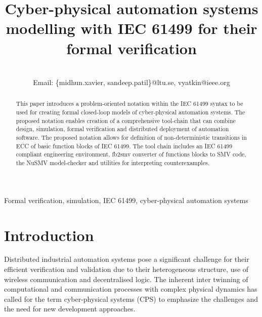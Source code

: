 \documentclass[conference]{IEEEtran}
\begin{document}
\title{Cyber-physical automation systems modelling with IEC 61499 for their formal verification}

\author{






\\ Email: \{midhun.xavier, sandeep.patil\}@ltu.se,  vyatkin@ieee.org
}


\maketitle

\begin{abstract}
This paper introduces a problem-oriented notation within the {IEC 61499} syntax to be used for creating formal closed-loop models of cyber-physical automation systems. The proposed notation enables creation of a comprehensive tool-chain that can combine design, simulation, formal verification and distributed deployment of automation software. 
The proposed notation allows for definition of non-deterministic transitions in ECC of basic function blocks of {IEC 61499}.
The tool chain includes an IEC 61499 compliant engineering environment, fb2smv converter of  functions blocks to {SMV} code, the  {NuSMV} model-checker and utilities for interpreting counterexamples. 



\end{abstract}

\begin{IEEEkeywords}
Formal verification, simulation, IEC 61499, cyber-physical automation systems
\end{IEEEkeywords}


\section{Introduction}

Distributed industrial automation systems pose a significant challenge for their efficient verification and validation due to their heterogeneous structure, use of wireless communication and decentralised logic. The inherent inter twinning of computational and communication processes with complex physical dynamics has called for the term cyber-physical systems (CPS) \cite{lee2017introduction} to emphasize the challenges and the need for new development approaches.   
\end{document}
